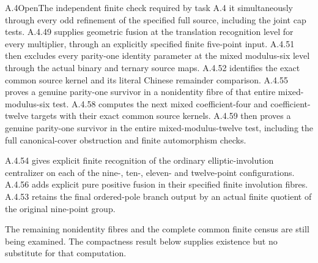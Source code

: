 \begin{result}{A.4}{Open}{The independent finite check required by task A.4}
it simultaneously through every odd refinement of the
specified full source, including the joint cap tests.
A.4.49 supplies geometric fusion at the translation
recognition level for every multiplier, through an explicitly
specified finite five-point input. A.4.51 then excludes every parity-one identity parameter
at the mixed modulus-six level through the actual binary
and ternary source maps. A.4.52 identifies the exact
common source kernel and its literal Chinese remainder
comparison. A.4.55 proves a genuine parity-one survivor
in a nonidentity fibre of that entire mixed-modulus-six test.
A.4.58 computes the next mixed coefficient-four and coefficient-twelve
targets with their exact common source kernels. A.4.59 then proves
a genuine parity-one survivor in the entire mixed-modulus-twelve
test, including the full canonical-cover obstruction and finite
automorphism checks.

 A.4.54 gives explicit finite recognition of
the ordinary elliptic-involution centralizer on each of
the nine-, ten-, eleven- and twelve-point configurations. A.4.56
adds explicit pure positive fusion in their specified finite involution
fibres. A.4.53 retains the final ordered-pole branch output by an
actual finite quotient of the original nine-point group.

 The remaining nonidentity fibres
and the complete common finite census are still being
examined. The compactness result below supplies existence
but no substitute for that computation.
\end{result}

